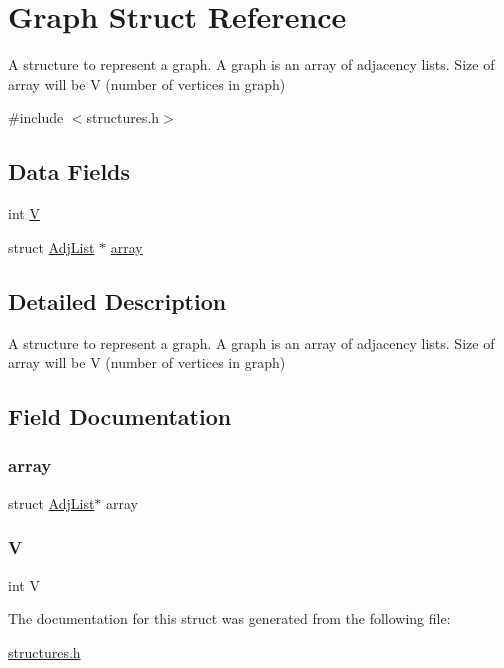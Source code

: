 \hypertarget{struct_graph}{}\section{Graph Struct Reference}
\label{struct_graph}


A structure to represent a graph. A graph is an array of adjacency lists. Size of array will be V (number of vertices in graph)  




{\ttfamily \#include $<$structures.\+h$>$}

\subsection*{Data Fields}
\begin{DoxyCompactItemize}
\item 
int \mbox{\hyperlink{struct_graph_a91e334f289dc11ba09da0df4a9c72123}{V}}
\item 
struct \mbox{\hyperlink{struct_adj_list}{Adj\+List}} $\ast$ \mbox{\hyperlink{struct_graph_a53d610af7a185acfc78c33e733e0d92e}{array}}
\end{DoxyCompactItemize}


\subsection{Detailed Description}
A structure to represent a graph. A graph is an array of adjacency lists. Size of array will be V (number of vertices in graph) 

\subsection{Field Documentation}
\mbox{\label{struct_graph_a53d610af7a185acfc78c33e733e0d92e}} 
\subsubsection{\texorpdfstring{array}{array}}
{\footnotesize\ttfamily struct \mbox{\hyperlink{struct_adj_list}{Adj\+List}}$\ast$ array}

\mbox{\label{struct_graph_a91e334f289dc11ba09da0df4a9c72123}} 
\subsubsection{\texorpdfstring{V}{V}}
{\footnotesize\ttfamily int V}



The documentation for this struct was generated from the following file\+:\begin{DoxyCompactItemize}
\item 
\mbox{\hyperlink{structures_8h}{structures.\+h}}\end{DoxyCompactItemize}
